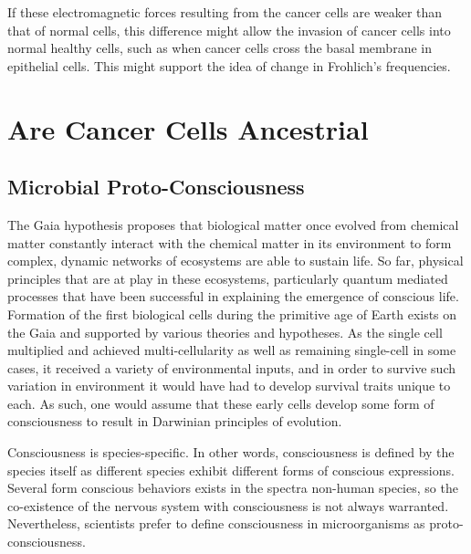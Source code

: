 \documentclass[letterpaper,final,times]{cas-dc}
\numberwithin{equation}{section}
\begin{document}
If these electromagnetic forces resulting from the cancer cells are weaker than that of normal cells, this difference might allow the invasion of cancer cells into normal healthy cells\citep{96}, such as when cancer cells cross the basal membrane in epithelial cells. This might support the idea of change in Frohlich’s frequencies.


\section{Are Cancer Cells Ancestrial}
\subsection{Microbial Proto-Consciousness} \noindent
The Gaia hypothesis proposes that biological matter once evolved from chemical matter constantly interact with the chemical
matter in its environment to form complex, dynamic networks of ecosystems are able to sustain life. So far, physical principles that are at play in these ecosystems, particularly quantum mediated processes that have been successful in explaining the emergence of conscious life\citep{39}. Formation of the first biological cells during the primitive age of Earth exists on the Gaia and supported by various theories and hypotheses\citep{41,42, 43}. As the single cell multiplied and achieved
multi-cellularity as well as remaining single-cell in some cases, it received a variety of environmental inputs, and in order to survive such variation in environment it would have had to develop survival traits unique to each. As such, one would assume that these early cells develop some form of consciousness to result in Darwinian principles of evolution.

Consciousness is species-specific. In other words, consciousness is defined by the species itself as different species exhibit different forms of conscious expressions. Several form conscious behaviors exists in the spectra non-human species, so the co-existence of the nervous system with consciousness is not always warranted\citep{9}. Nevertheless, scientists prefer to define consciousness in microorganisms as proto-consciousness.
\end{document}
